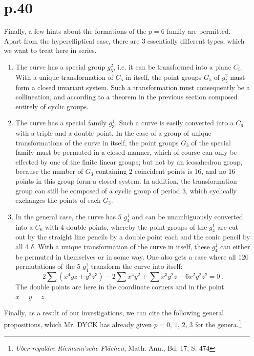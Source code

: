 \documentclass[leqno]{article}
\begin{document}
\section{p.40}
Finally, a few hints about the formations of the $p=6$ family are permitted. Apart from the hyperelliptical case, there are 3 essentially different types, which we want to treat here in series.
\begin{enumerate}[label=\arabic*)]
	\item The curve has a special group $g_5^2$, i.e. it can be transformed into a plane $C_5$. With a unique transformation of $C_5$ in itself, the point groups $G_5$ of $g_5^2$ must form a closed invariant system. Such a transformation must consequently be a collineation, and according to a theorem in the previous section composed entirely of cyclic groups.
	\item The curve has a special family $g_3^1$. Such a curve is easily converted into a $C_6$ with a triple and a double point. In the case of a group of unique transformations of the curve in itself, the point groups $G_3$ of the special family must be permuted in a closed manner, which of course can only be effected by one of the finite linear groups; but not by an icosahedron group, because the number of $G_3$ containing 2 coincident points is 16, and no 16 points in this group form a closed system. In addition, the transformation group can still be composed of a cyclic group of period 3, which cyclically exchanges the points of each $G_3$.
	\item In the general case, the curve has 5 $g_4^1$ and can be unambiguously converted into a $C_6$ with 4 double points, whereby the point groups of the $g_4^1$ are cut out by the straight line pencils by a double point each and the conic pencil by all 4 $\delta$. With a unique transformation of the curve in itself, these $g_4^1$ can either be permuted in themselves or in some way. One also gets a case where all 120 permutations of the 5 $g_4^1$ transform the curve into itself: 
	\[
	2 \sum (x^4 y z + y^3 z^3) - 2 \sum x^4 y^2 + \sum x^3 y^2 z - 6 x^2 y^2 z^2 = 0 \, . 
	\]
	The double points are here in the coordinate corners and in the point $x=y=z$.
\end{enumerate}
Finally, as a result of our investigations, we can cite the following general propositions, which Mr. DYCK has already given $p=0, \, 1, \, 2, \, 3$ for the genera.\footnote{\textit{\"Uber regul\"are Riemann'sche Fl\"achen}, Math. Ann., Bd. 17, S. 474} \\
\end{document}
